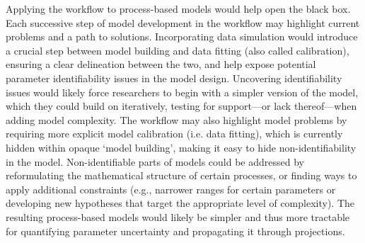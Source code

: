 \documentclass[11pt]{article}
\begin{document}
Applying the workflow to process-based models would help open the black box.
Each successive step of model development in the workflow may highlight current problems and a path to solutions. Incorporating data simulation would introduce a crucial step between model building and data fitting (also called calibration), ensuring a clear delineation between the two, and help expose potential parameter identifiability issues in the model design. 
Uncovering identifiability issues would likely force researchers to begin with a simpler version of the model, which they could build on iteratively, testing for support---or lack thereof---when adding model complexity. The workflow may also highlight model problems by requiring more explicit model calibration (i.e. data fitting), which is currently hidden within opaque `model building', making it easy to hide non-identifiability in the model. Non-identifiable parts of models could be addressed by reformulating the mathematical structure of certain processes, or finding ways to apply additional constraints (e.g., narrower ranges for certain parameters or developing new hypotheses that target the appropriate level of complexity). The resulting process-based models would likely be simpler and thus more tractable for quantifying parameter uncertainty and propagating it through projections. 
\end{document}
